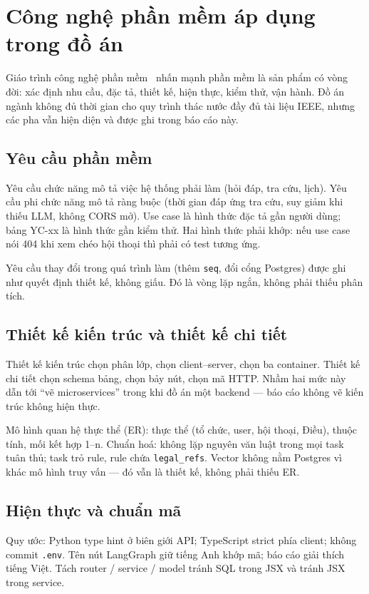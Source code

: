 \section{Công nghệ phần mềm áp dụng trong đồ án}

Giáo trình công nghệ phần mềm~\cite{thanh2024} nhấn mạnh phần mềm là sản phẩm
có vòng đời: xác định nhu cầu, đặc tả, thiết kế, hiện thực, kiểm thử, vận hành.
Đồ án ngành không đủ thời gian cho quy trình thác nước đầy đủ tài liệu IEEE, nhưng
các pha vẫn hiện diện và được ghi trong báo cáo này.

\subsection{Yêu cầu phần mềm}

Yêu cầu chức năng mô tả việc hệ thống phải làm (hỏi đáp, tra cứu, lịch). Yêu cầu
phi chức năng mô tả ràng buộc (thời gian đáp ứng tra cứu, suy giảm khi thiếu
LLM, không CORS mở). Use case là hình thức đặc tả gần người dùng; bảng YC-xx là
hình thức gần kiểm thử. Hai hình thức phải khớp: nếu use case nói 404 khi xem
chéo hội thoại thì phải có test tương ứng.

Yêu cầu thay đổi trong quá trình làm (thêm \texttt{seq}, đổi cổng Postgres) được
ghi như quyết định thiết kế, không giấu. Đó là vòng lặp ngắn, không phải thiếu
phân tích.

\subsection{Thiết kế kiến trúc và thiết kế chi tiết}

Thiết kế kiến trúc chọn phân lớp, chọn client--server, chọn ba container. Thiết
kế chi tiết chọn schema bảng, chọn bảy nút, chọn mã HTTP. Nhầm hai mức này dẫn
tới ``vẽ microservices'' trong khi đồ án một backend --- báo cáo không vẽ kiến
trúc không hiện thực.

Mô hình quan hệ thực thể (ER): thực thể (tổ chức, user, hội thoại, Điều), thuộc
tính, mối kết hợp 1--n. Chuẩn hoá: không lặp nguyên văn luật trong mọi task tuân
thủ; task trỏ rule, rule chứa \texttt{legal\_refs}. Vector không nằm Postgres vì
khác mô hình truy vấn --- đó vẫn là thiết kế, không phải thiếu ER.

\subsection{Hiện thực và chuẩn mã}

Quy ước: Python type hint ở biên giới API; TypeScript strict phía client; không
commit \texttt{.env}. Tên nút LangGraph giữ tiếng Anh khớp mã; báo cáo giải thích
tiếng Việt. Tách router / service / model tránh SQL trong JSX và tránh JSX trong
service.

